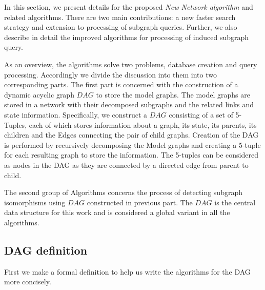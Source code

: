In this section, we present details for the proposed \textit{ New Network algorithm} and related algorithms. 
There are two main contributions: a new faster search strategy and extension to processing of subgraph queries.
Further, we also describe in detail the improved algorithms for processing of induced subgraph query.


As an  overview, the algorithms solve two problems, database creation and query processing. Accordingly we divide the discussion into them into two corresponding parts.
The first part is concerned with the construction of a dynamic acyclic graph $DAG$ to store the model graphs. 
The model graphs are stored in a network with their decomposed subgraphs and the related links and state information. 
Specifically, we construct a $DAG$ consisting of a set of 5-Tuples, each of which  stores information about a graph, its state, its parents, its children and the Edges connecting the pair of child graphs. 
Creation of the DAG is performed by recursively decomposing the Model graphs and creating a 5-tuple for each resulting graph to store the information. 
The 5-tuples can be considered as nodes in the DAG as they are connected by a directed edge from parent to child.

The second group of Algorithms concerns the process of detecting subgraph isomorphisms using $DAG$ constructed in previous part. 
The $DAG$ is the central data structure for this work and is considered  a global variant in all the algorithms. 

\subsection{DAG definition}
First we make a formal definition to help us write the algorithms for the DAG more concisely.



